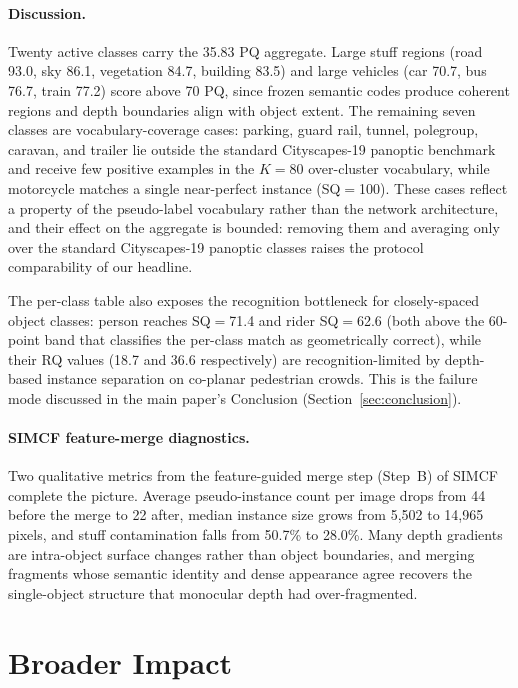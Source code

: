 \documentclass{article}
\begin{document}
\paragraph{Discussion.}
Twenty active classes carry the 35.83 PQ aggregate. Large stuff regions (road 93.0, sky 86.1, vegetation 84.7, building 83.5) and large vehicles (car 70.7, bus 76.7, train 77.2) score above 70 PQ, since frozen semantic codes produce coherent regions and depth boundaries align with object extent. The remaining seven classes are vocabulary-coverage cases: parking, guard rail, tunnel, polegroup, caravan, and trailer lie outside the standard Cityscapes-19 panoptic benchmark and receive few positive examples in the $K{=}80$ over-cluster vocabulary, while motorcycle matches a single near-perfect instance (SQ$=$100). These cases reflect a property of the pseudo-label vocabulary rather than the network architecture, and their effect on the aggregate is bounded: removing them and averaging only over the standard Cityscapes-19 panoptic classes raises the protocol comparability of our headline.

The per-class table also exposes the recognition bottleneck for closely-spaced object classes: person reaches SQ$=$71.4 and rider SQ$=$62.6 (both above the 60-point band that classifies the per-class match as geometrically correct), while their RQ values (18.7 and 36.6 respectively) are recognition-limited by depth-based instance separation on co-planar pedestrian crowds. This is the failure mode discussed in the main paper's Conclusion (Section~\ref{sec:conclusion}).

\paragraph{SIMCF feature-merge diagnostics.}
Two qualitative metrics from the feature-guided merge step (Step~B) of SIMCF complete the picture. Average pseudo-instance count per image drops from 44 before the merge to 22 after, median instance size grows from 5{,}502 to 14{,}965 pixels, and stuff contamination falls from 50.7\% to 28.0\%. Many depth gradients are intra-object surface changes rather than object boundaries, and merging fragments whose semantic identity and dense appearance agree recovers the single-object structure that monocular depth had over-fragmented.

\section{Broader Impact}
\label{sec:impact}
\end{document}
